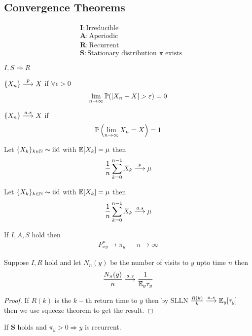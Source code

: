 \documentclass[12pt,a4paper]{article}
\begin{document}
\subsection{Convergence Theorems}
\begin{note}
\begin{align*}
&\mathbf{I}: \text{Irreducible}\\
&\mathbf{A}: \text{Aperiodic}\\
&\mathbf{R}: \text{Recurrent}\\
&\mathbf{S}: \text{Stationary distribution $\pi$ exists}
\end{align*}
\end{note}
\begin{remark}
$I, S \Rightarrow R$
\end{remark}
\begin{defn}
$\{X_n\}\overset{p}{\longrightarrow} X$ if $\forall \epsilon > 0$
\begin{align*}
\lim\limits_{n \rightarrow \infty} \mathbb{P}(|X_n - X| > \varepsilon) = 0
\end{align*}
\end{defn}
\begin{defn}
$\{X_n\}\overset{a.s}{\longrightarrow} X$ if 
\begin{align*}
\mathbb{P}\left(\lim\limits_{n \rightarrow \infty}X_n = X\right) = 1
\end{align*}
\end{defn}
\begin{thm}
Let $\{X_k\}_{k\in \mathbb{N}} \thicksim \mathrm{iid}$ with $\mathbb{E}[X_k] = \mu$ then 
\begin{align*}
\frac{1}{n}\sum\limits_{k=0}^{n-1}X_k \overset{p}{\longrightarrow} \mu
\end{align*}
\end{thm}
\begin{thm}
Let $\{X_k\}_{k\in \mathbb{N}} \thicksim \mathrm{iid}$ with $\mathbb{E}[X_k] = \mu$ then 
\begin{align*}
\frac{1}{n}\sum\limits_{k=0}^{n-1}X_k \overset{a.s}{\longrightarrow} \mu
\end{align*}
\end{thm}
\begin{thm}\label{convthm}
If $I,A,S$ hold then 
\begin{align*}
P_{xy}^n \to \pi_y && n\to \infty
\end{align*}
\end{thm}
\begin{thm}\label{asymfreq}
Suppose $I,R$ hold and let $N_n(y)$ be the number of visits to $y$ upto time $n$ then 
\begin{align*}
\frac{N_n(y)}{n} \overset{a.s}{\longrightarrow} \frac{1}{\mathbb{E}_y \tau_y}
\end{align*} 
\end{thm}
\begin{proof}
If $R(k)$ is the $k-$th return time to $y$ then by SLLN $\frac{R(k)}{k} \overset{a.s}{\longrightarrow} \mathbb{E}_y[\tau_y]$ then we use squeeze theorem to get the result.   
\end{proof}
\newpage
\begin{lemma}
If $\mathbf{S}$ holds and $\pi_y > 0 \Rightarrow y$ is recurrent. 
\end{lemma}
\end{document}
